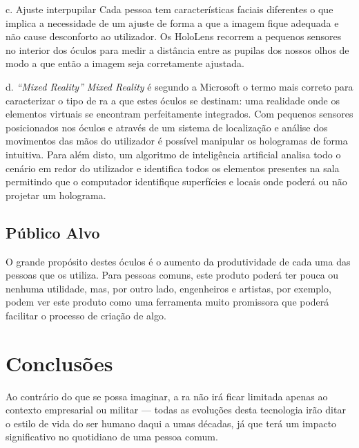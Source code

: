 \documentclass{report}
\begin{document}
c. Ajuste interpupilar
Cada pessoa tem características faciais diferentes o que implica a necessidade de um ajuste de forma a que a imagem fique adequada e não cause desconforto ao utilizador. Os HoloLens recorrem a pequenos sensores no interior dos óculos para medir a distância entre as pupilas dos nossos olhos de modo a que então a imagem seja corretamente ajustada.

d. \textit{“Mixed Reality”}
\textit{Mixed Reality} é segundo a Microsoft o termo mais correto para caracterizar o tipo de \ac{ra} a que estes óculos se destinam: uma realidade onde os elementos virtuais se encontram perfeitamente integrados. Com pequenos sensores posicionados nos óculos e através de um sistema de localização e análise dos movimentos das mãos do utilizador é possível manipular os hologramas de forma intuitiva. Para além disto, um algoritmo de inteligência artificial analisa todo o cenário em redor do utilizador e identifica todos os elementos presentes na sala permitindo que o computador identifique superfícies e locais onde poderá ou não projetar um holograma.


\section{Público Alvo}
O grande propósito destes óculos é o aumento da produtividade de cada uma das pessoas que os utiliza.
Para pessoas comuns, este produto poderá ter pouca ou nenhuma utilidade, mas, por outro lado, engenheiros e artistas, por exemplo, podem ver este produto como uma ferramenta muito promissora que poderá facilitar o processo de criação de algo.

\chapter{Conclusões}
\label{chap.conclusao}

Ao contrário do que se possa imaginar, a \ac{ra} não irá ficar limitada apenas ao contexto empresarial ou militar — todas as evoluções desta tecnologia irão ditar o estilo de vida do ser humano daqui a umas décadas, já que terá um impacto significativo no quotidiano de uma pessoa comum.
\end{document}
